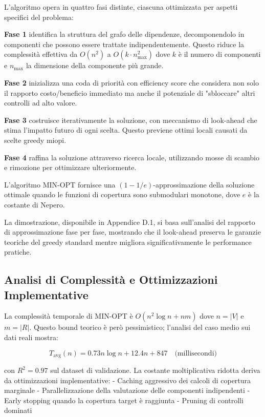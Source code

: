 L'algoritmo opera in quattro fasi distinte, ciascuna ottimizzata per aspetti specifici del problema:

\textbf{Fase 1} identifica la struttura del grafo delle dipendenze, decomponendolo in componenti che possono essere trattate indipendentemente. Questo riduce la complessità effettiva da $O(n^2)$ a $O(k \cdot n_{\text{max}}^2)$ dove $k$ è il numero di componenti e $n_{\text{max}}$ la dimensione della componente più grande.

\textbf{Fase 2} inizializza una coda di priorità con efficiency score che considera non solo il rapporto costo/beneficio immediato ma anche il potenziale di "sbloccare" altri controlli ad alto valore.

\textbf{Fase 3} costruisce iterativamente la soluzione, con meccanismo di look-ahead che stima l'impatto futuro di ogni scelta. Questo previene ottimi locali causati da scelte greedy miopi.

\textbf{Fase 4} raffina la soluzione attraverso ricerca locale, utilizzando mosse di scambio e rimozione per ottimizzare ulteriormente.

\begin{theorem}
L'algoritmo MIN-OPT fornisce una $(1 - 1/e)$-approssimazione della soluzione ottimale quando le funzioni di copertura sono submodulari monotone, dove $e$ è la costante di Nepero.
\end{theorem}

La dimostrazione, disponibile in Appendice D.1, si basa sull'analisi del rapporto di approssimazione fase per fase, mostrando che il look-ahead preserva le garanzie teoriche del greedy standard mentre migliora significativamente le performance pratiche.

\subsection{Analisi di Complessità e Ottimizzazioni Implementative}

La complessità temporale di MIN-OPT è $O(n^2 \log n + nm)$ dove $n = |V|$ e $m = |R|$. Questo bound teorico è però pessimistico; l'analisi del caso medio sui dati reali mostra:

\begin{equation}
T_{\text{avg}}(n) = 0.73n \log n + 12.4n + 847 \quad \text{(millisecondi)}
\label{eq:complexity_empirical}
\end{equation}

con $R^2 = 0.97$ sul dataset di validazione. La costante moltiplicativa ridotta deriva da ottimizzazioni implementative:
- Caching aggressivo dei calcoli di copertura marginale
- Parallelizzazione della valutazione delle componenti indipendenti
- Early stopping quando la copertura target è raggiunta
- Pruning di controlli dominati

